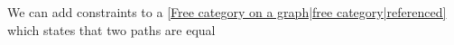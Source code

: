 We can add constraints to a \ref{Free category on a graph|free category|referenced} which states that two paths are equal
